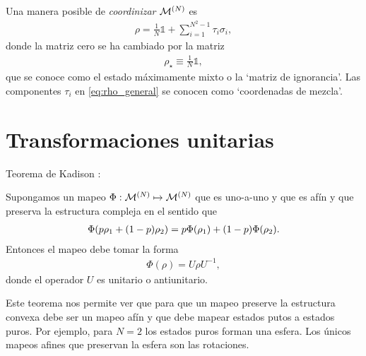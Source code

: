 Una manera posible de \textit{coordinizar} $\mathcal{M}^{(N)}$ es 
\begin{align}
	\rho = \frac{1}{N} \mathbb{1} + \sum _{i=1}^{N^2-1} \tau_i\sigma_i,	
	\label{eq:rho_general}
\end{align}
donde la matriz cero se ha cambiado por la matriz
\begin{align}
	\rho _{\star} \equiv \frac{1}{N}\mathbb{1},
	\label{eq:max_mixed_state}
\end{align}
que se conoce como el estado máximamente mixto o la `matriz de ignorancia'. 
Las componentes $\tau_i$ en \eqref{eq:rho_general} se conocen como `coordenadas
de mezcla'.
\section{Transformaciones unitarias} %

Teorema de Kadison \cite{bengtsson_zyczkowski_2017}:
\begin{teorema} 
	Supongamos un mapeo $\Phi:\mathcal{M}^{(N)} \mapsto \mathcal{M}^{(N)}$ que es uno-a-uno y que es afín y
	que preserva la estructura compleja en el sentido que
	\begin{align}
		\Phi \qty(p\rho_1 + \qty(1-p)\rho_2) = p\Phi(\rho_1) + 
		\qty(1-p)\Phi(\rho_2).
	\end{align}
	Entonces el mapeo debe tomar la forma
	\begin{align}
		\Phi(\rho) = U\rho U^{-1},
	\end{align}
	donde el operador $U$ es unitario o antiunitario.
\end{teorema}

Este teorema nos permite ver que para que un mapeo preserve la estructura 
convexa debe ser un mapeo afín y que debe mapear estados putos
a estados puros. Por ejemplo, para $N=2$ los estados puros forman una
esfera. Los únicos mapeos afines que preservan la esfera son las rotaciones.




